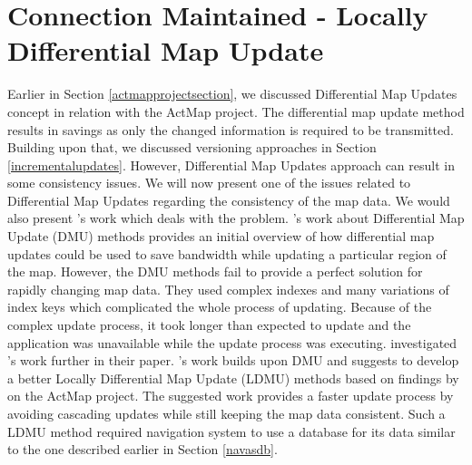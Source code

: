 \section{Connection Maintained - Locally Differential Map Update} \label{cmldmu}
Earlier in Section \ref{actmapprojectsection}, we discussed Differential Map Updates concept in relation with the ActMap project. The differential map update method results in savings as only the changed information is required to be transmitted. Building upon that, we discussed versioning approaches in Section \ref{incrementalupdates}. However, Differential Map Updates approach can result in some consistency issues. We will now present one of the issues related to Differential Map Updates regarding the consistency of the map data. We would also present \citet{asahara2008locally}'s work which deals with the problem. \citet{sakamoto2000proposal}'s work about Differential Map Update (DMU) methods provides an initial overview of how differential map updates could be used to save bandwidth while updating a particular region of the map. However, the DMU methods fail to provide a perfect solution for rapidly changing map data. They used complex indexes and many variations of index keys which complicated the whole process of updating. Because of the complex update process, it took longer than expected to update and the application was unavailable while the update process was executing. \citet{asahara2008locally} investigated \citet{sakamoto2000proposal}'s work further in their paper. \citet{asahara2008locally}'s work builds upon DMU and suggests to develop a better Locally Differential Map Update (LDMU) methods based on findings by \citet{flament2005results} on the ActMap project\cite{flament2003actmap}. The suggested work provides a faster update process by avoiding cascading updates while still keeping the map data consistent. Such a LDMU method required navigation system to use a database for its data similar to the one described earlier in Section \ref{navasdb}. \\

